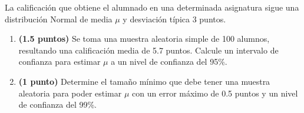
La calificación que obtiene el alumnado en una determinada asignatura sigue una distribución Normal de media $\mu$ y desviación típica 3 puntos.
\begin{enumerate}[label=\alph*)]
\item \textbf{(1.5 puntos)} Se toma una muestra aleatoria simple de 100 alumnos, resultando una calificación media de 5.7 puntos. Calcule un intervalo de confianza para estimar $\mu$ a un nivel de confianza del 95\%.
\item \textbf{(1 punto)} Determine el tamaño mínimo que debe tener una muestra aleatoria para poder estimar $\mu$ con un error máximo de 0.5 puntos y un nivel de confianza del 99\%.
\end{enumerate}
